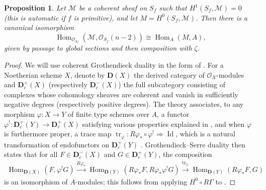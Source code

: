 \documentclass{article} %
\newtheorem{proposition}{Proposition}[section]
\numberwithin{equation}{section}
\DeclareMathOperator{\Id}{Id}
\DeclareMathOperator{\Hom}{Hom}
\DeclareMathOperator{\tr}{tr}
\newcommand{\cO}{\mathcal{O}}
\newcommand{\cM}{\mathcal{M}}
\begin{document}
\begin{proposition}\label{prop_application_of_global_duality}
    Let $\cM$ be a coherent sheaf on $S_f$ such that $H^1(S_f, \cM) = 0$ (this is automatic if $f$ is primitive), and let $M = H^0(S_f, \cM)$. Then there is a canonical isomorphism
    \[ \Hom_{\cO_{S_f}}(\cM, \cO_{S_f}(n-2)) \cong \Hom_A(M, A), \]
    given by passage to global sections and then composition with $\zeta$. 
\end{proposition}
\begin{proof}
    We will use coherent Grothendieck duality in the form of \cite{Har66, conrad-grothendieckduality}.
    For a Noetherian scheme $X$, denote by $\mathbf{D}(X)$ the derived category of $\cO_X$-modules and $\mathbf{D}^+_c(X)$ (respectively $\mathbf{D}^-_c(X)$) the full subcategory consisting of complexes whose cohomology sheaves are coherent and vanish in sufficiently negative degrees (respectively positive degrees).
    The theory associates, to any morphism $\varphi\colon X\rightarrow Y$ of finite type schemes over $A$, a functor $\varphi^!\colon \mathbf{D}^+_c(Y)\rightarrow \mathbf{D}^+_c(X)$ satisfying various properties explained in \cite[Section 3.3]{conrad-grothendieckduality}, and when $\varphi$ is furthermore proper, a trace map $\tr_{\varphi}\colon R\varphi_* \circ \varphi^{!} \Rightarrow \Id$, which is a natural transformation of endofunctors on $\mathbf{D}^+_c(Y)$ \cite[\S3.4]{conrad-grothendieckduality}.
    Grothendieck--Serre duality then states that for all $F \in \mathbf{D}_c^-(X)$ and $G\in \mathbf{D}_c^+(Y)$, the composition 
    \begin{align}\label{eq_grothserredualitymap}
        \Hom_{\mathbf{D}(X)}(F, \varphi^! G) \xrightarrow{R\varphi_*} 
        \Hom_{\mathbf{D}(Y)}(R\varphi_* F, R\varphi_* \varphi^! G) \xrightarrow{\tr_{\varphi}}
        \Hom_{\mathbf{D}(Y)}(R \varphi_* F, G)
    \end{align}
    is an isomorphism of $A$-modules; this follows from applying $H^0\circ R\Gamma$ to \cite[Theorem 3.4.4]{conrad-grothendieckduality}.


\end{proof}
\end{document}
